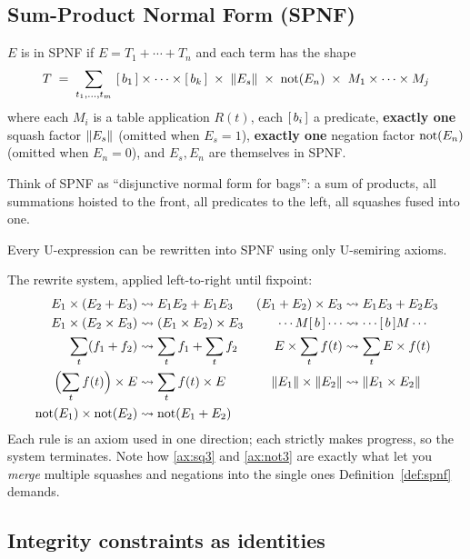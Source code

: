\subsection{Sum-Product Normal Form (SPNF)}

\begin{definition}\label{def:spnf}
$E$ is in SPNF if $E = T_1+\cdots+T_n$ and each term has the shape
\[
T \;=\; \sum_{t_1,\dots,t_m}\ [\,b_1\,]\times\cdots\times[\,b_k\,]
\;\times\; \left\lVert E_s \right\rVert \;\times\; \mathrm{not}(E_n) \;\times\; M_1\times\cdots\times M_j
\]
where each $M_i$ is a table application $R(t)$, each $[\,b_i\,]$ a predicate,
\textbf{exactly one} squash factor $\left\lVert E_s \right\rVert$ (omitted when $E_s=1$),
\textbf{exactly one} negation factor $\mathrm{not}(E_n)$ (omitted when $E_n=0$), and
$E_s,E_n$ are themselves in SPNF.
\end{definition}

Think of SPNF as ``disjunctive normal form for bags'': a sum of products, all summations
hoisted to the front, all predicates to the left, all squashes fused into one.

\begin{theorem}
Every U-expression can be rewritten into SPNF using only U-semiring axioms.
\end{theorem}

The rewrite system, applied left-to-right until fixpoint:
\begin{align*}
E_1\times(E_2+E_3) &\rightsquigarrow E_1E_2+E_1E_3 &
(E_1+E_2)\times E_3 &\rightsquigarrow E_1E_3+E_2E_3\\
E_1\times(E_2\times E_3) &\rightsquigarrow (E_1\times E_2)\times E_3 &
\cdots M[\,b\,]\cdots &\rightsquigarrow \cdots [\,b\,] M\cdots\\
\sum_{t}(f_1+f_2) &\rightsquigarrow \sum_{t}f_1+\sum_{t}f_2 &
E\times\sum_{t}f(t) &\rightsquigarrow \sum_{t}E\times f(t)\\
\Bigl(\sum_{t}f(t)\Bigr)\times E &\rightsquigarrow \sum_{t}f(t)\times E &
\left\lVert E_1 \right\rVert\times\left\lVert E_2 \right\rVert &\rightsquigarrow \left\lVert E_1\times E_2 \right\rVert\\
\mathrm{not}(E_1)\times\mathrm{not}(E_2) &\rightsquigarrow \mathrm{not}(E_1+E_2) &&
\end{align*}
Each rule is an axiom used in one direction; each strictly makes progress, so the system
terminates. Note how \eqref{ax:sq3} and \eqref{ax:not3} are exactly what let you
\emph{merge} multiple squashes and negations into the single ones Definition~\ref{def:spnf}
demands.

\subsection{Integrity constraints as identities}
\label{sec:key}

